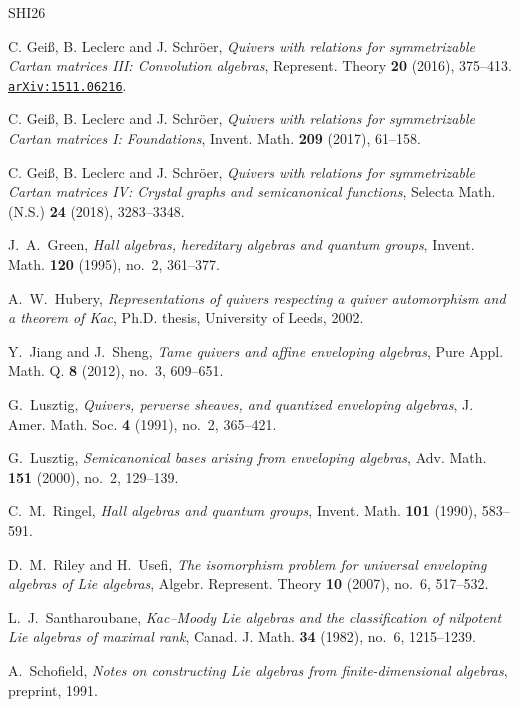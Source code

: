 \documentclass[12pt,reqno]{amsart}
\newcommand{\arxiv}[1]{\href{http://arxiv.org/abs/#1}{\tt arXiv:\nolinkurl{#1}}}
\numberwithin{equation}{section}
\theoremstyle{definition}
\theoremstyle{remark}
\theoremstyle{plain}
\theoremstyle{plain}
\begin{document}
\begin{thebibliography}{SHI26}

     C. Gei\ss, B. Leclerc and J. Schr\"{o}er, \emph{Quivers with relations for symmetrizable Cartan matrices III: Convolution algebras}, Represent. Theory \textbf{20} (2016), 375--413. \arxiv{1511.06216}.

     C. Gei\ss, B. Leclerc and J. Schr\"{o}er,
    \emph{Quivers with relations for symmetrizable Cartan matrices I:
    Foundations}, Invent. Math. \textbf{209} (2017), 61--158.

     C. Gei\ss, B. Leclerc and J. Schr\"{o}er,
    \emph{Quivers with relations for symmetrizable Cartan matrices IV:
    Crystal graphs and semicanonical functions}, Selecta Math. (N.S.)
    \textbf{24} (2018), 3283--3348.

     J.~A.~Green, \emph{Hall algebras, hereditary algebras and quantum groups}, Invent. Math. \textbf{120} (1995), no.~2, 361--377.

     A.~W.~Hubery,
    \emph{Representations of quivers respecting a quiver automorphism and a theorem of Kac}, Ph.D. thesis, University of Leeds, 2002.

     Y.~Jiang and J.~Sheng,
    \emph{Tame quivers and affine enveloping algebras}, Pure Appl. Math. Q. \textbf{8} (2012), no.~3, 609--651.

     G.~Lusztig, \emph{Quivers, perverse sheaves, and quantized enveloping algebras}, J. Amer. Math. Soc. \textbf{4} (1991), no.~2, 365--421.

     G.~Lusztig,
    \emph{Semicanonical bases arising from enveloping algebras}, Adv. Math. \textbf{151} (2000), no.~2, 129--139.

     C.~M.~Ringel, \emph{Hall algebras and quantum groups}, Invent. Math. \textbf{101} (1990), 583--591.

     D.~M.~Riley and H.~Usefi, \emph{The isomorphism problem for universal enveloping algebras of Lie algebras}, Algebr. Represent. Theory \textbf{10} (2007), no.~6, 517--532.

     L.~J.~Santharoubane, \emph{Kac--Moody Lie algebras and the classification of nilpotent Lie algebras of maximal rank}, Canad. J. Math. \textbf{34} (1982), no.~6, 1215--1239.

     A.~Schofield, \emph{Notes on constructing Lie algebras from finite-dimensional algebras}, preprint, 1991.

\end{thebibliography}
\end{document}
